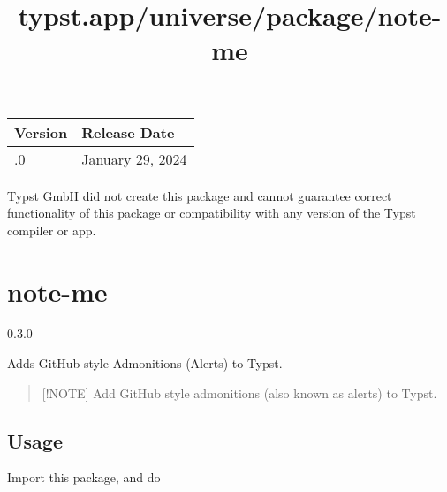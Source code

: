 \begin{longtable}[]{@{}ll@{}}
\toprule\noalign{}
Version & Release Date \\
\midrule\noalign{}
\endhead
\bottomrule\noalign{}
\endlastfoot
0.1.0 & January 29, 2024 \\
\end{longtable}

Typst GmbH did not create this package and cannot guarantee correct
functionality of this package or compatibility with any version of the
Typst compiler or app.


\title{typst.app/universe/package/note-me}

\label{banner}
\section{note-me}\label{note-me}

{ 0.3.0 }

Adds GitHub-style Admonitions (Alerts) to Typst.

\label{readme}
\begin{quote}
{[}!NOTE{]} Add GitHub style admonitions (also known as alerts) to
Typst.
\end{quote}

\subsection{Usage}\label{usage}

Import this package, and do

